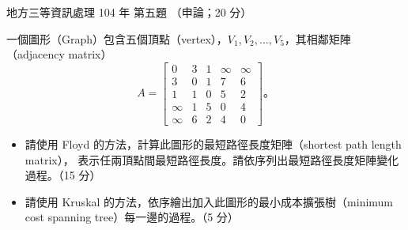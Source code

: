 \begin{pastexam}[label={px:df3-104-ds-05}]{地方三等資訊處理 104 年 第五題}
（申論；20 分）

一個圖形（Graph）包含五個頂點（vertex），$V_1, V_2, \ldots, V_5$，其相鄰矩陣（adjacency
matrix）
\[
A = \begin{bmatrix}
0 & 3 & 1 & \infty & \infty \\
3 & 0 & 1 & 7 & 6 \\
1 & 1 & 0 & 5 & 2 \\
\infty & 1 & 5 & 0 & 4 \\
\infty & 6 & 2 & 4 & 0
\end{bmatrix}\text{。}
\]
\begin{itemize}[leftmargin=2em, labelsep=0.3em, itemsep=2pt]
\item[㈠] 請使用 Floyd 的方法，計算此圖形的最短路徑長度矩陣（shortest path length matrix），
表示任兩頂點間最短路徑長度。請依序列出最短路徑長度矩陣變化過程。（15 分）
\item[㈡] 請使用 Kruskal 的方法，依序繪出加入此圖形的最小成本擴張樹（minimum cost spanning
tree）每一邊的過程。（5 分）
\end{itemize}
\end{pastexam}

